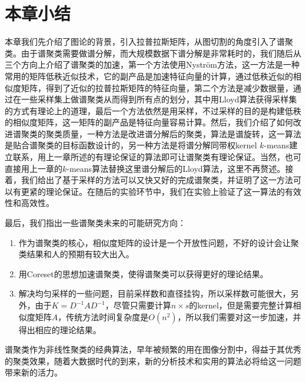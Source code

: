 \section{本章小结}
本章我们先介绍了图论的背景，引入拉普拉斯矩阵，从图切割的角度引入了谱聚类。由于谱聚类需要做谱分解，而大规模数据下谱分解是非常耗时的，我们随后从三个方向上介绍了谱聚类的加速，第一个方法使用Nyström方法，这一方法是一种常用的矩阵低秩近似技术，它的副产品是加速特征向量的计算，通过低秩近似的相似度矩阵，得到了近似的拉普拉斯矩阵的特征向量，第二个方法是减少数据量，通过在一些采样集上做谱聚类从而得到所有点的划分，其中用Lloyd算法获得采样集的方式有理论上的道理，最后一个方法依然是用采样，不过采样的目的是构建低秩的相似度矩阵，这一矩阵的副产品是特征向量容易计算。然后，我们介绍了如何改进谱聚类的聚类质量，一种方法是改进谱分解后的聚类，算法是谱旋转，这一算法是贴合谱聚类的目标函数设计的，另一种方法是将谱分解同带权kernel $k$-means建立联系，用上一章所述的有理论保证的算法即可让谱聚类有理论保证。当然，也可直接用上一章的$k$-means算法替换这里谱分解后的Lloyd算法，这里不再赘述。接着，我们给出了基于采样的方法可以又快又好的完成谱聚类，并证明了这一方法可以有更紧的理论保证。在随后的实验环节中，我们在实验上验证了这一算法的有效性和高效性。

最后，我们指出一些谱聚类未来的可能研究方向：
\begin{enumerate}
	\item 作为谱聚类的核心，相似度矩阵的设计是一个开放性问题，不好的设计会让聚类结果和人的预期有较大出入。
	\item 用Coreset的思想加速谱聚类，使得谱聚类可以获得更好的理论结果。
	\item 解决均匀采样的一些问题，目前采样数和直径挂钩，所以采样数可能很大，另外，由于$K = D^{-1}AD^{-1}$，尽管只需要计算$n \times s$的kernel，但是需要完整计算相似度矩阵$A$，传统方法时间复杂度是$O(n^2)$，所以我们需要对这一步加速，并得出相应的理论结果。
\end{enumerate}
谱聚类作为非线性聚类的经典算法，早年被频繁的用在图像分割中，得益于其优秀的聚类效果，随着大数据时代的到来，新的分析技术和实用的算法必将给这一问题带来新的活力。